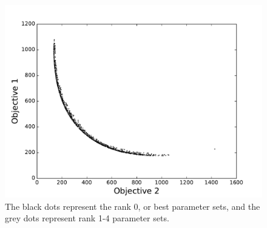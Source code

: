 \documentclass[fleqn,10pt]{wlscirep}
\begin{document}
\begin{figure}[ht]
       \centering
       \includegraphics[width=\linewidth]{figures/TradeOffCurveSlowerCooling}
       \caption{The black dots represent the rank 0, or best parameter sets, and the grey dots represent rank 1-4 parameter sets.}
       \label{fig:tradeoffcurveslower}
\end{figure}


\end{document}
